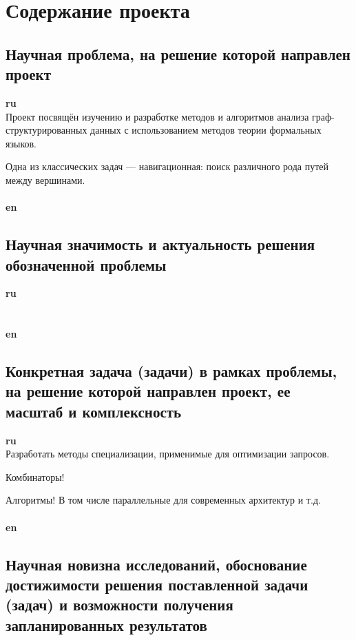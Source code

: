 \documentclass[12pt]{article}  %
\theoremstyle{remark}
\begin{document}
\section{Содержание проекта}

\subsection{Научная проблема, на решение которой направлен проект}

\textbf{ru}\\
%
Проект посвящён изучению и разработке методов и алгоритмов анализа граф-структурированных данных с использованием методов теории формальных языков.

Одна из классических задач --- навигационная: поиск различного рода путей между вершинами.
\\
\\
\textbf{en}\\

\subsection{Научная значимость и актуальность решения обозначенной проблемы}

\textbf{ru}\\
%
\\
\\
\textbf{en}\\


\subsection{Конкретная задача (задачи) в рамках проблемы, на решение которой направлен проект, ее масштаб и комплексность}

\textbf{ru}\\
%
Разработать методы специализации, применимые для оптимизации запросов.

Комбинаторы!

Алгоритмы! В том числе параллельные для современных архитектур и т.д.
\\
\\
\textbf{en}\\

\subsection{Научная новизна исследований, обоснование достижимости решения поставленной задачи (задач) и возможности получения запланированных результатов}
\end{document}
